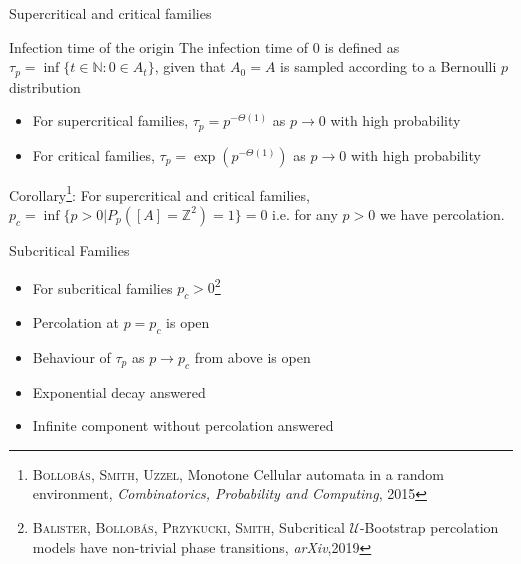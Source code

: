 \begin{frame}{Supercritical and critical families}
\begin{block}{Infection time of the origin}
The infection time of 0 is defined as $\tau_p=\inf\{t\in\mathbb{N}: 0 \in A_t\}$, given that $A_0=A$ is sampled according to a Bernoulli $p$ distribution
\end{block}

\begin{itemize}
    \item For supercritical families, $\tau_p=p^{-\Theta(1)}$ as $p\rightarrow 0$ with high probability
    \item For critical families, $\tau_p=\exp(p^{-\Theta(1)})$ as 
    $p\rightarrow 0$ with high probability
\end{itemize}

Corollary\footnote{\textsc{Bollobás, Smith, Uzzel}, Monotone Cellular automata in a random environment, \emph{Combinatorics, Probability and Computing}, 2015}: For supercritical and critical families, $p_c=\inf\{p>0|P_p([A]=\mathbb{Z}^2)=1\}=0$ i.e. for any $p>0$ we have percolation.

    
\end{frame}


\begin{frame}{Subcritical Families}

\begin{itemize}
    \item For subcritical families $p_c>0$\footnote{\textsc{Balister, Bollobás, Przykucki, Smith}, Subcritical $\mathcal{U}$-Bootstrap percolation models have non-trivial phase transitions, \emph{arXiv},2019}
    \item Percolation at $p=p_c$ is open
    \item Behaviour of $\tau_p$ as $p\rightarrow p_c$ from above is open
    \item Exponential decay answered 
    \item Infinite component without percolation answered
\end{itemize}
    
\end{frame}
